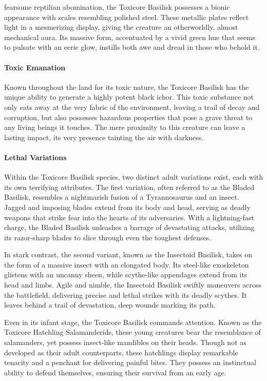 \documentclass[letterpaper,openany,twoside,twocolumn]{book}
\begin{document}
\entryfont \noindent {} fearsome reptilian abomination, the Toxicore Basilisk possesses a bionic appearance with scales resembling polished steel. These metallic plates reflect light in a mesmerizing display, giving the creature an otherworldly, almost mechanical aura. Its massive form, accentuated by a vivid green hue that seems to pulsate with an eerie glow, instills both awe and dread in those who behold it.
\paragraph{Toxic Emanation} Known throughout the land for its toxic nature, the Toxicore Basilisk has the unique ability to generate a highly potent black ichor. This toxic substance not only eats away at the very fabric of the environment, leaving a trail of decay and corruption, but also possesses hazardous properties that pose a grave threat to any living beings it touches. The mere proximity to this creature can leave a lasting impact, its very presence tainting the air with darkness.

\paragraph{Lethal Variations} Within the Toxicore Basilisk species, two distinct adult variations exist, each with its own terrifying attributes. The first variation, often referred to as the Bladed Basilisk, resembles a nightmarish fusion of a Tyrannosaurus and an insect. Jagged and imposing blades extend from its body and head, serving as deadly weapons that strike fear into the hearts of its adversaries. With a lightning-fast charge, the Bladed Basilisk unleashes a barrage of devastating attacks, utilizing its razor-sharp blades to slice through even the toughest defenses.

In stark contrast, the second variant, known as the Insectoid Basilisk, takes on the form of a massive insect with an elongated body. Its steel-like exoskeleton glistens with an uncanny sheen, while scythe-like appendages extend from its head and limbs. Agile and nimble, the Insectoid Basilisk swiftly maneuvers across the battlefield, delivering precise and lethal strikes with its deadly scythes. It leaves behind a trail of devastation, deep wounds marking its path.

Even in its infant stage, the Toxicore Basilisk commands attention. Known as the Toxicore Hatchling Salamanderids, these young creatures bear the resemblance of salamanders, yet possess insect-like mandibles on their heads. Though not as developed as their adult counterparts, these hatchlings display remarkable tenacity and a penchant for delivering painful bites. They possess an instinctual ability to defend themselves, ensuring their survival from an early age.
\end{document}

